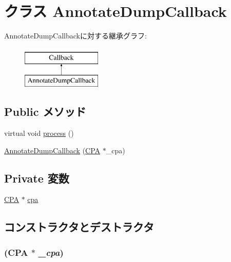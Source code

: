 \hypertarget{classAnnotateDumpCallback}{
\section{クラス AnnotateDumpCallback}
\label{classAnnotateDumpCallback}
}
AnnotateDumpCallbackに対する継承グラフ:\begin{figure}[H]
\begin{center}
\leavevmode
\includegraphics[height=2cm]{classAnnotateDumpCallback}
\end{center}
\end{figure}
\subsection*{Public メソッド}
\begin{DoxyCompactItemize}
\item 
virtual void \hyperlink{classAnnotateDumpCallback_a2e9c5136d19b1a95fc427e0852deab5c}{process} ()
\item 
\hyperlink{classAnnotateDumpCallback_aab30b6fea3c0d23dc9935fda6156d8e1}{AnnotateDumpCallback} (\hyperlink{classCPA}{CPA} $\ast$\_\-cpa)
\end{DoxyCompactItemize}
\subsection*{Private 変数}
\begin{DoxyCompactItemize}
\item 
\hyperlink{classCPA}{CPA} $\ast$ \hyperlink{classAnnotateDumpCallback_ad3738d2e08f4ea21f1c3721f2492c9c2}{cpa}
\end{DoxyCompactItemize}


\subsection{コンストラクタとデストラクタ}
\hypertarget{classAnnotateDumpCallback_aab30b6fea3c0d23dc9935fda6156d8e1}{
\subsubsection[{AnnotateDumpCallback}]{ ({\bf CPA} $\ast$ {\em \_\-cpa})}}
\label{classAnnotateDumpCallback_aab30b6fea3c0d23dc9935fda6156d8e1}



